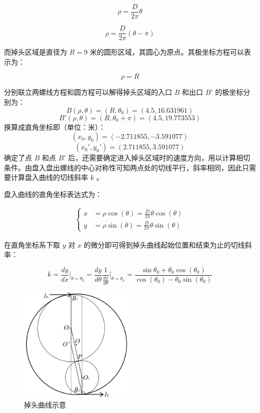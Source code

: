 \documentclass[a4paper]{article}
\begin{document}
		\begin{equation}
			\rho = \frac{D}{2\pi} \theta
		\end{equation}

		\begin{equation}
			\rho = \frac{D}{2\pi} (\theta - \pi)
		\end{equation}

		而掉头区域是直径为 $R = 9$ 米的圆形区域，其圆心为原点。其极坐标方程可以表示为：

		\begin{equation}
			\rho = R
		\end{equation}

		分别联立两螺线方程和圆方程可以解得掉头区域的入口 $B$ 和出口 $B'$ 的极坐标分别为：
		$$ B(\rho, \theta) = (R, \theta_0) = (4.5, 16.631961) $$
		$$ B'(\rho, \theta) = (R, \theta_0 + \pi) = (4.5, 19.773553)$$
		换算成直角坐标即（单位：米）：
		$$ (x_0, y_0) = (-2.711855, -3.591077) $$
		$$ (x_0', y_0') = (2.711855, 3.591077) $$
		确定了点 $B$ 和点 $B'$ 后，还需要确定进入掉头区域时的速度方向，用以计算相切条件。由盘入盘出螺线的中心对称性可知两点处的切线平行，斜率相同，因此只需要计算盘入曲线的切线斜率 $k$ 。

		盘入曲线的直角坐标表达式为：

		\begin{align}
			\left\{
			\begin{aligned}
				x &= \rho \cos(\theta) = \frac{D}{2\pi} \theta \cos(\theta) \\
				y &= \rho \sin(\theta) = \frac{D}{2\pi} \theta \sin(\theta)
			\end{aligned}
			\right.
		\end{align}

		在直角坐标系下取 $y$ 对 $x$ 的微分即可得到掉头曲线起始位置和结束为止的切线斜率：

		\begin{equation}
			k = \frac{dy}{dx}\Bigg|_{\theta=\theta_0} = \frac{dy}{d\theta} \frac{1}{\frac{dx}{d\theta}} \Bigg|_{\theta=\theta_0} = \frac{\sin\theta_0 + \theta_0 \cos(\theta_0)}{\cos(\theta_0) - \theta_0 \sin(\theta_0)}
		\end{equation}

		\begin{figure}[H]
			\centering
			\includegraphics[width=0.5\textwidth]{image/Figure_5411.png}
			\caption{掉头曲线示意}
			\label{Figure_5411}
		\end{figure}
\end{document}
